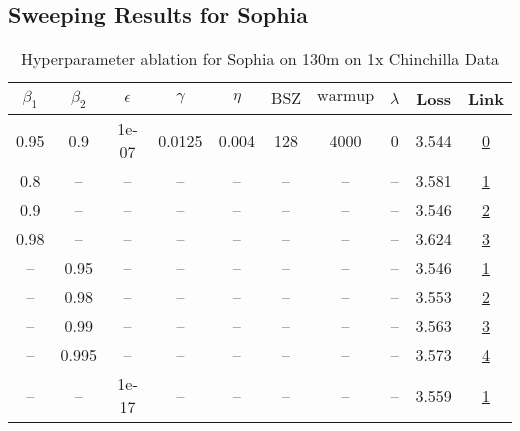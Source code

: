 \subsection{Sweeping Results for Sophia}%
\begin{table}[H]
\centering
\caption{Hyperparameter ablation for Sophia on 130m on 1x Chinchilla Data}
\label{tab:ablation_sophia_130m_on_1x_chinchilla_data}
\begin{tabular}{cccccccccc}
\toprule
$\beta_1$ & $\beta_2$ & $\epsilon$ & $\gamma$ & $\eta$ & $\mathrm{BSZ}$ & $\mathrm{warmup}$ & $\lambda$ & Loss & Link \\
\midrule
0.95 & 0.9 & 1e-07 & 0.0125 & 0.004 & 128 & 4000 & 0 & 3.544 & \href{https://wandb.ai/stanford-mercury/optimizer-scaling/runs/sweep-130m-2B-sophiag67fd60lr0.004-wd0-minlr0-warmup4000-b10.95--7bdb33}{0} \\
\midrule
0.8 & -- & -- & -- & -- & -- & -- & -- & 3.581 & \href{https://wandb.ai/stanford-mercury/optimizer-scaling/runs/sweep-130m-2B-sophiagf9d750lr0.004-wd0-minlr0-warmup4000-b10.8-b-1d728f}{1} \\
0.9 & -- & -- & -- & -- & -- & -- & -- & 3.546 & \href{https://wandb.ai/stanford-mercury/optimizer-scaling/runs/sweep-130m-2B-sophiau81957flr0.004-wd0-minlr0-warmup4000-b10.9-b-743aad}{2} \\
0.98 & -- & -- & -- & -- & -- & -- & -- & 3.624 & \href{https://wandb.ai/stanford-mercury/optimizer-scaling/runs/sweep-130m-2B-sophiagcf99e7lr0.004-wd0-minlr0-warmup4000-b10.98--b5b74a}{3} \\
-- & 0.95 & -- & -- & -- & -- & -- & -- & 3.546 & \href{https://wandb.ai/stanford-mercury/optimizer-scaling/runs/sweep-130m-2B-sophiaud75557lr0.004-wd0-minlr0-warmup4000-b10.95--9bc769}{1} \\
-- & 0.98 & -- & -- & -- & -- & -- & -- & 3.553 & \href{https://wandb.ai/stanford-mercury/optimizer-scaling/runs/sweep-130m-2B-sophiag5970d9lr0.004-wd0-minlr0-warmup4000-b10.95--d5a961}{2} \\
-- & 0.99 & -- & -- & -- & -- & -- & -- & 3.563 & \href{https://wandb.ai/stanford-mercury/optimizer-scaling/runs/sweep-130m-2B-sophiagceaccflr0.004-wd0-minlr0-warmup4000-b10.95--4fb41c}{3} \\
-- & 0.995 & -- & -- & -- & -- & -- & -- & 3.573 & \href{https://wandb.ai/stanford-mercury/optimizer-scaling/runs/sweep-130m-2B-sophiauf73bb0lr0.004-wd0-minlr0-warmup4000-b10.95--c36e04}{4} \\
-- & -- & 1e-17 & -- & -- & -- & -- & -- & 3.559 & \href{https://wandb.ai/stanford-mercury/optimizer-scaling/runs/sweep-130m-2B-sophiag262464lr0.004-wd0-minlr0-warmup4000-b10.95--b0ffca}{1} \\

\end{tabular}
\end{table}
